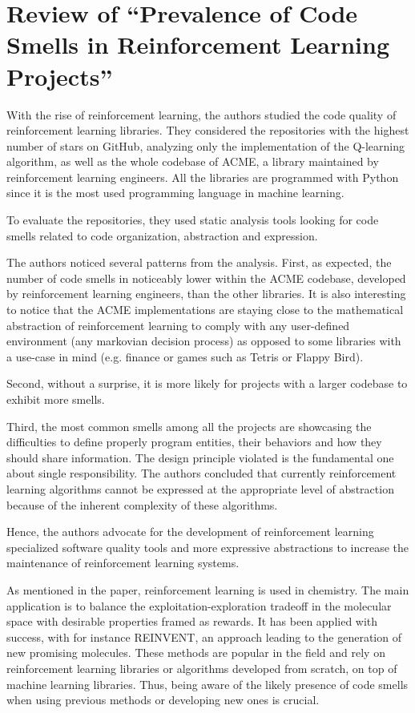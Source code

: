 \documentclass[11pt,a4paper]{article}
\begin{document}
\section{Review of “Prevalence of Code Smells in Reinforcement Learning Projects”}
With the rise of reinforcement learning, the authors studied the code quality of reinforcement learning libraries. They considered the repositories with the highest number of stars on GitHub, analyzing only the implementation of the Q-learning algorithm, as well as the whole codebase of ACME, a library maintained by reinforcement learning engineers. All the libraries are programmed with Python since it is the most used programming language in machine learning.

To evaluate the repositories, they used static analysis tools looking for code smells related to code organization, abstraction and expression.

The authors noticed several patterns from the analysis. First, as expected, the number of code smells in noticeably lower within the ACME codebase, developed by reinforcement learning engineers, than the other libraries. It is also interesting to notice that the ACME implementations are staying close to the mathematical abstraction of reinforcement learning to comply with any user-defined environment (any markovian decision process) as opposed to some libraries with a use-case in mind (e.g. finance or games such as Tetris or Flappy Bird).

Second, without a surprise, it is more likely for projects with a larger codebase to exhibit more smells.

Third, the most common smells among all the projects are showcasing the difficulties to define properly program entities, their behaviors and how they should share information. The design principle violated is the fundamental one about single responsibility. The authors concluded that currently reinforcement learning algorithms cannot be expressed at the appropriate level of abstraction because of the inherent complexity of these algorithms.

Hence, the authors advocate for the development of reinforcement learning specialized software quality tools and more expressive abstractions to increase the maintenance of reinforcement learning systems.

As mentioned in the paper, reinforcement learning is used in chemistry. The main application is to balance the exploitation-exploration tradeoff in the molecular space with desirable properties framed as rewards. It has been applied with success, with for instance REINVENT, an approach leading to the generation of new promising molecules. These methods are popular in the field and rely on reinforcement learning libraries or algorithms developed from scratch, on top of machine learning libraries. Thus, being aware of the likely presence of code smells when using previous methods or developing new ones is crucial.
\end{document}
